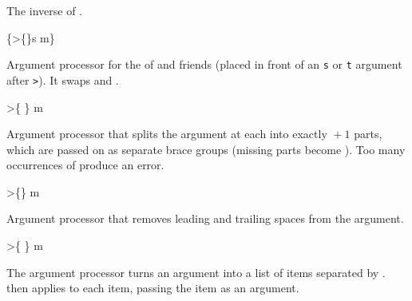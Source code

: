 \documentclass{l3in2edoc}
\begin{document}
\begin{function}[TF,user]
  {
    \IfValue
  }
  \begin{syntax}
       
  \end{syntax}
  The inverse of .
\end{function}



\begin{function}[user]
  {
    \ReverseBoolean
  }
  \begin{syntax}
    \{>\{\}s m\}
  \end{syntax}
  Argument processor for the  of
   and friends (placed in front of an
  \texttt{s} or \texttt{t} argument after \texttt{>}). It swaps
   and .
\end{function}


\begin{function}[user]
  {
    \SplitArgument
  }
  \begin{syntax}
    >\{  \} m
  \end{syntax}
  Argument processor that splits the argument at each 
  into exactly ${}+1$ parts, which are passed on as
  separate brace groups (missing parts become ). Too many
  occurrences of  produce an error.
\end{function}


\begin{function}[user]
  {
    \TrimSpaces
  }
  \begin{syntax}
    >\{\} m
  \end{syntax}
  Argument processor that removes leading and trailing spaces from the
  argument.
\end{function}


\begin{function}[user]
  {
    \ProcessList
  }
  \begin{syntax}
    >\{ \} m
      
  \end{syntax}
  The argument processor  turns an argument into a list
  of items separated by .  then applies
   to each item, passing the item as an argument.
\end{function}
\end{document}
